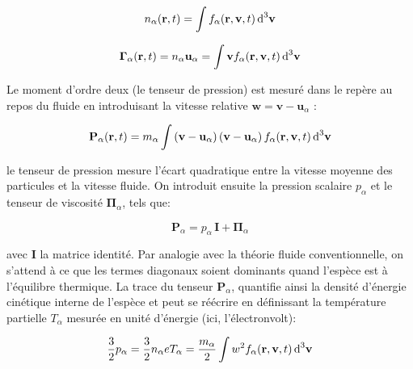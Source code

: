 \begin{refsection}
\begin{equation}
n_\alpha(\mathbf
r,t)=\int f_\alpha(\mathbf r,\mathbf v,t)
\,\text{d}^{{3}}\mathbf{v}
\end{equation}

\begin{equation}
\boldsymbol{\Gamma}_\alpha(\mathbf
r,t)=n_\alpha\mathbf u_\alpha=\int \mathbf v f_\alpha(\mathbf r,\mathbf
v,t) \,\text{d}^{{3}}\mathbf{v}
\end{equation}

Le moment d'ordre deux (le tenseur de pression) est mesuré dans le repère au
repos du fluide en introduisant la vitesse relative $\mathbf w=\mathbf
v-\mathbf u_\alpha$ : 

\begin{equation}
\mathbf P_\alpha(\mathbf
r,t)=m_\alpha\int \left(\mathbf
v-\mathbf u_\alpha\right)\left(\mathbf
v-\mathbf u_\alpha\right)
f_\alpha(\mathbf r,\mathbf v,t) \,\text{d}^{{3}}\mathbf{v}
\end{equation}

le tenseur de pression mesure l'écart quadratique entre la vitesse moyenne des
particules et la vitesse fluide. On introduit ensuite la
pression scalaire $p_\alpha$ et le tenseur de viscosité
$\boldsymbol{\Pi}_\alpha$, tels que:

\begin{equation}
\label{1-tenseurPression}
\mathbf P_\alpha=p_\alpha\,\mathbf I + \boldsymbol{\Pi}_\alpha
\end{equation}

avec $\mathbf I$ la matrice identité. Par analogie avec la théorie fluide
conventionnelle, on s'attend à ce que les termes diagonaux soient dominants
quand l'espèce est à l'équilibre thermique. La trace du tenseur
$\mathbf P_\alpha$, quantifie ainsi la densité d'énergie cinétique
interne de l'espèce et peut se réécrire en définissant la température partielle 
$T_\alpha$ mesurée en unité d'énergie (ici, l'électronvolt):

\begin{equation}
\frac{3}{2}p_\alpha=\frac{3}{2}n_\alpha eT_\alpha=\frac{m_\alpha}{2}\int 
w^{{2}} f_\alpha(\mathbf r,\mathbf v,t) \,\text{d}^{{3}}\mathbf{v}
\end{equation}


\end{refsection}
